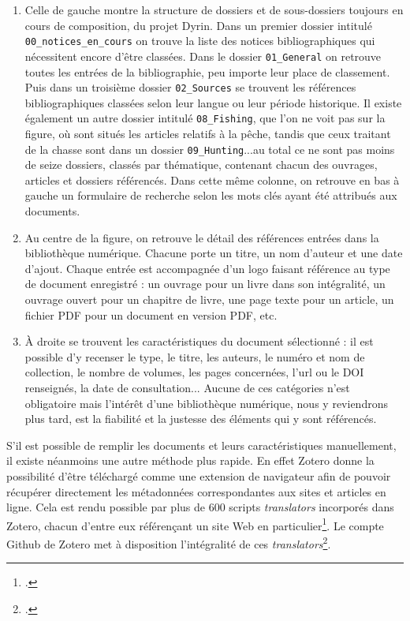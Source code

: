 \documentclass[a4paper,12pt,twoside]{book}
\begin{document}
\begin{enumerate}
    \item Celle de gauche montre la structure de dossiers et de sous-dossiers toujours en cours de composition, du projet Dyrin. Dans un premier dossier intitulé \texttt{00\_notices\_en\_cours} on trouve la liste des notices bibliographiques qui nécessitent encore d'être classées. Dans le dossier \texttt{01\_General} on retrouve toutes les entrées de la bibliographie, peu importe leur place de classement. Puis dans un troisième dossier \texttt{02\_Sources} se trouvent les références bibliographiques classées selon leur langue ou leur période historique. Il existe également un autre dossier intitulé \texttt{08\_Fishing}, que l'on ne voit pas sur la figure, où sont situés les articles relatifs à la pêche, tandis que ceux traitant de la chasse sont dans un dossier \texttt{09\_Hunting}...au total ce ne sont pas moins de seize dossiers, classés par thématique, contenant chacun des ouvrages, articles et dossiers référencés. Dans cette même colonne, on retrouve en bas à gauche un formulaire de recherche selon les mots clés ayant été attribués aux documents.
    \item Au centre de la figure, on retrouve le détail des références entrées dans la bibliothèque numérique. Chacune porte un titre, un nom d'auteur et une date d'ajout. Chaque entrée est accompagnée d'un logo faisant référence au type de document enregistré : un ouvrage pour un livre dans son intégralité, un ouvrage ouvert pour un chapitre de livre, une page texte pour un article, un fichier PDF pour un document en version PDF, etc.
    \item À droite se trouvent les caractéristiques du document sélectionné : il est possible d'y recenser le type, le titre, les auteurs, le numéro et nom de collection, le nombre de volumes, les pages concernées, l'url ou le DOI renseignés, la date de consultation... Aucune de ces catégories n'est obligatoire mais l'intérêt d'une bibliothèque numérique, nous y reviendrons plus tard, est la fiabilité et la justesse des éléments qui y sont référencés. 
\end{enumerate}

S'il est possible de remplir les documents et leurs caractéristiques manuellement, il existe néanmoins une autre méthode plus \og rapide\fg. En effet Zotero donne la possibilité d'être téléchargé comme une extension de navigateur afin de pouvoir récupérer directement les métadonnées correspondantes aux sites et articles en ligne. Cela est rendu possible par plus de 600 scripts \textit{translators} incorporés dans Zotero, chacun d'entre eux référençant un site Web en particulier\footcite{translators}. Le compte Github de Zotero met à disposition l'intégralité de ces \textit{translators}\footcite{githubzotero}.
\end{document}
